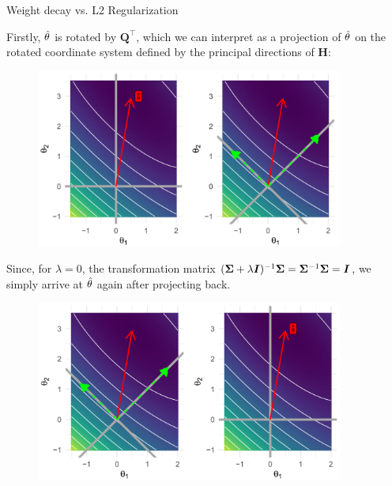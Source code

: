 \begin{vbframe}{Weight decay vs. L2 Regularization}
\framebreak

Firstly, $\hat{\theta}$ is rotated by $\bm{Q}^{\top}$, which we can interpret as a projection of $\hat{\theta}$ on the rotated coordinate system defined by the principal directions of $\bm{H}$:

\begin{figure}
\includegraphics[width=0.9\textwidth]{figure_man/L2-regularization03.png}\\
\end{figure}

\framebreak

Since, for $\lambda = 0$, the transformation matrix $(\bm{\Sigma} + \lambda \boldsymbol{I})^{-1} \bm{\Sigma} = \bm{\Sigma}^{-1} \bm{\Sigma} = \boldsymbol{I}$, we simply arrive at $\hat{\theta}$ again after projecting back.

\begin{figure}
\includegraphics[width=0.9\textwidth]{figure_man/L2-regularization04.png}\\
\end{figure}



\end{vbframe}
